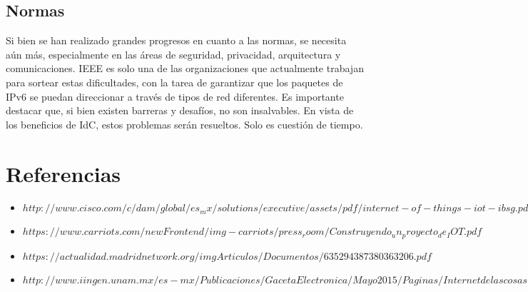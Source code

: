 \documentclass[12pt,letterpaper]{article}
\begin{document}
\subsection*{Normas}
Si bien se han realizado grandes progresos en cuanto a las normas, se necesita aún
más, especialmente en las áreas de seguridad, privacidad, arquitectura y comunicaciones.
IEEE es solo una de las organizaciones que actualmente trabajan para sortear estas
dificultades, con la tarea de garantizar que los paquetes de IPv6 se puedan direccionar a
través de tipos de red diferentes.
Es importante destacar que, si bien existen barreras y desafíos, no son insalvables. En vista
de los beneficios de IdC, estos problemas serán resueltos. Solo es cuestión de tiempo. 

\section*{Referencias}

\begin{itemize}
\item $http://www.cisco.com/c/dam/global/es_mx/solutions/executive/assets/pdf/internet-of-things-iot-ibsg.pdf$
\item $https://www.carriots.com/newFrontend/img-carriots/press_room/Construyendo_un_proyecto_de_IOT.pdf$
\item $https://actualidad.madridnetwork.org/imgArticulos/Documentos/635294387380363206.pdf$
\item $http://www.iingen.unam.mx/es-mx/Publicaciones/GacetaElectronica/Mayo2015/Paginas/Internetdelascosas.aspx$
\end{itemize}
\end{document}
